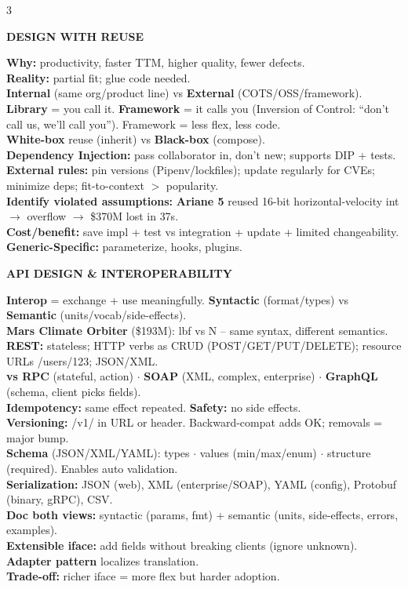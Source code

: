 \documentclass[10pt,letterpaper]{article}
\newenvironment{topic}[1]{%
  \par\addvspace{1.5pt}%
  \noindent\colorbox{hdrBG}{%
    \begin{minipage}{\dimexpr\linewidth-2\fboxsep\relax}%
      \centering\bfseries\sffamily\fontsize{6pt}{7pt}\selectfont\color{hdrFG}\MakeUppercase{#1}%
    \end{minipage}%
  }\par\nobreak\vskip0.5pt%
  \begingroup\setlength{\leftskip}{0pt}\setlength{\rightskip}{0pt}%
}{%
  \endgroup\par\addvspace{0.5pt}%
}
\newcommand{\warn}[1]{\textcolor{warnC}{\textbf{#1}}}
\newcommand{\hd}[1]{\textcolor{accent}{\textbf{#1}}}
\newcommand{\cn}[1]{{\ttfamily\small #1}}
\begin{document}
\begin{multicols*}{3}
\begin{topic}{Design with Reuse}
\hd{Why:} productivity, faster TTM, higher quality, fewer defects.\\
\hd{Reality:} partial fit; glue code needed.\\
\hd{Internal} (same org/product line) vs \hd{External} (COTS/OSS/framework).\\
\hd{Library} = you call it. \hd{Framework} = it calls you (Inversion of Control: ``don't call us, we'll call you''). Framework = less flex, less code.\\
\hd{White-box} reuse (inherit) vs \hd{Black-box} (compose).\\
\hd{Dependency Injection:} pass collaborator in, don't \cn{new}; supports DIP + tests.\\
\hd{External rules:} pin versions (Pipenv/lockfiles); update regularly for CVEs; minimize deps; fit-to-context $>$ popularity.\\
\hd{Identify violated assumptions:} \warn{Ariane 5} reused 16-bit horizontal-velocity int $\to$ overflow $\to$ \$370M lost in 37s.\\
\hd{Cost/benefit:} save impl + test vs integration + update + limited changeability.\\
\hd{Generic-Specific:} parameterize, hooks, plugins.
\end{topic}

\begin{topic}{API Design \& Interoperability}
\hd{Interop} = exchange + use meaningfully. \hd{Syntactic} (format/types) vs \hd{Semantic} (units/vocab/side-effects).\\
\warn{Mars Climate Orbiter} (\$193M): lbf vs N -- same syntax, different semantics.\\
\hd{REST:} stateless; HTTP verbs as CRUD (POST/GET/PUT/DELETE); resource URLs \cn{/users/123}; JSON/XML.\\
\hd{vs RPC} (stateful, action) $\cdot$ \hd{SOAP} (XML, complex, enterprise) $\cdot$ \hd{GraphQL} (schema, client picks fields).\\
\hd{Idempotency:} same effect repeated. \hd{Safety:} no side effects.\\
\hd{Versioning:} \cn{/v1/} in URL or header. Backward-compat adds OK; removals = major bump.\\
\hd{Schema} (JSON/XML/YAML): types $\cdot$ values (min/max/enum) $\cdot$ structure (required). Enables auto validation.\\
\hd{Serialization:} JSON (web), XML (enterprise/SOAP), YAML (config), Protobuf (binary, gRPC), CSV.\\
\hd{Doc both views:} syntactic (params, fmt) + semantic (units, side-effects, errors, examples).\\
\hd{Extensible iface:} add fields without breaking clients (ignore unknown).\\
\hd{Adapter pattern} localizes translation.\\
\hd{Trade-off:} richer iface = more flex but harder adoption.
\end{topic}


\end{multicols*}
\end{document}
